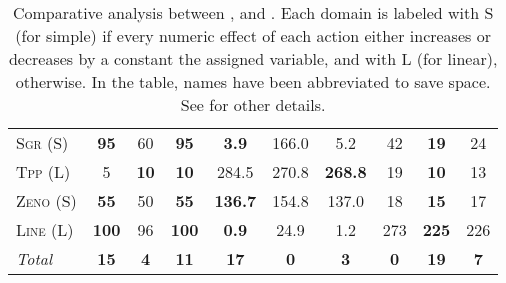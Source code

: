 \documentclass[11pt]{article}
\begin{document}
\begin{table*}[tb]
{\begin{tabular}{|l||ccc||ccc||ccc||}
\textsc{Sgr} (S)&\textbf{95}&60&\textbf{95}&\textbf{3.9}&166.0&5.2&42&\textbf{19}&24\\
\textsc{Tpp} (L)&5&\textbf{10}&\textbf{10}&284.5&270.8&\textbf{268.8}&19&\textbf{10}&13\\
\textsc{Zeno} (S)&\textbf{55}&50&\textbf{55}&\textbf{136.7}&154.8&137.0&18&\textbf{15}&17\\
\textsc{Line} (L)&\textbf{100}&96&\textbf{100}&\textbf{0.9}&24.9&1.2&273&\textbf{225}&226
\\\hline
\textit{Total}&\textbf{15}&\textbf{4}&\textbf{11}&\textbf{17}&\textbf{0}&\textbf{3}&\textbf{0}&\textbf{19}&\textbf{7}\\\hline

        \end{tabular}}
        \caption{Comparative analysis between  \pattye, \pattym and \pattyi. Each domain is labeled with S (for simple) if every numeric effect of each action either increases or decreases by a constant the assigned variable, and with L (for linear), otherwise. In the table, names have been abbreviated to save space.  See \cite{ipc2023} for other details.}
        \label{tab:qual-plans}
        \end{table*}
        
\end{document}
